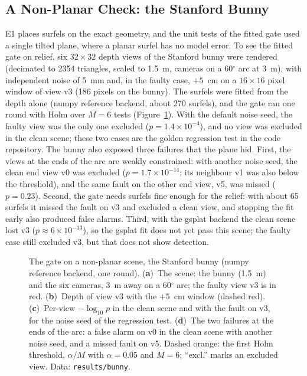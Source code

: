 \FloatBarrier
\subsection{A Non-Planar Check: the Stanford Bunny}
\label{sec:results:bunny}
E1 places surfels on the exact geometry, and the unit tests of the fitted gate used a single tilted
plane, where a planar surfel has no model error. To see the fitted gate on relief, six $32\times32$
depth views of the Stanford bunny \cite{data_bunny} were rendered (decimated to 2354 triangles, scaled to
1.5~m, cameras on a 60$^{\circ}$ arc at 3~m), with independent noise of 5~mm and, in the faulty case,
$+5$~cm on a $16\times16$ pixel window of view v3 (186 pixels on the bunny). The surfels were fitted from
the depth alone (numpy reference backend, about 270 surfels), and the gate ran one round with Holm over
$M=6$ tests (Figure~\ref{fig:bunny}). With the default noise seed, the faulty view was the only one
excluded ($p=1.4\times10^{-4}$), and no view was excluded in the clean scene; these two cases are the
golden regression test in the code repository. The bunny also exposed three failures that the plane
hid. First, the views at the ends of the arc are weakly constrained: with another noise seed, the clean
end view v0 was excluded ($p=1.7\times10^{-14}$; its neighbour v1 was also below the threshold), and the same fault on the other end view, v5, was
missed ($p=0.23$). Second, the gate needs surfels fine enough for the relief: with about 65 surfels it
missed the fault on v3 and excluded a clean view, and stopping the fit early also produced false alarms.
Third, with the gsplat backend the clean scene lost v3 ($p\approx6\times10^{-13}$), so the gsplat fit
does not yet pass this scene; the faulty case still excluded v3, but that does not show detection.

\begin{figure}[!htbp]
\centering

\caption{The gate on a non-planar scene, the Stanford bunny (numpy reference backend, one round).
(\textbf{a})~The scene: the bunny (1.5~m) and the six cameras, 3~m away on a 60$^{\circ}$ arc; the
faulty view v3 is in red. (\textbf{b})~Depth of view v3 with the $+5$~cm window (dashed red).
(\textbf{c})~Per-view $-\log_{10}p$ in the clean scene and with the fault on v3, for the noise seed of
the regression test. (\textbf{d})~The two failures at the ends of the arc: a false alarm on v0 in the
clean scene with another noise seed, and a missed fault on v5. Dashed orange: the first Holm threshold,
$\alpha/M$ with $\alpha=0.05$ and $M=6$; ``excl.'' marks an excluded view. Data: \texttt{results/bunny}.}
\label{fig:bunny}
\end{figure}

